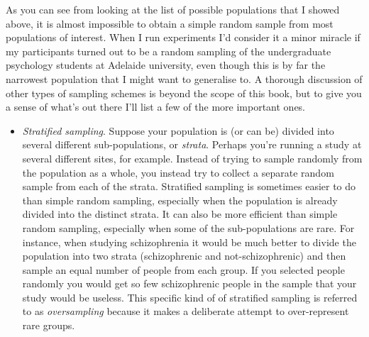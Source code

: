 
As you can see from looking at the list of possible populations that I showed above, it is almost impossible to obtain a simple random sample from most populations of interest. When I run experiments I'd consider it a minor miracle if my participants turned out to be a random sampling of the undergraduate psychology students at Adelaide university, even though this is by far the narrowest population that I might want to generalise to. A thorough discussion of other types of sampling schemes is beyond the scope of this book, but to give you a sense of what's out there I'll list a few of the more important ones.

\begin{itemize} 
\item {\it Stratified sampling}. Suppose your population is (or can be) divided into several different sub-populations, or {\it strata}. Perhaps you're running a study at several different sites, for example. Instead of trying to sample randomly from the population as a whole, you instead try to collect a separate random sample from each of the strata. Stratified sampling is sometimes easier to do than simple random sampling, especially when the population is already divided into the distinct strata. It can also be more efficient than simple random sampling, especially when some of the sub-populations are rare. For instance, when studying schizophrenia it would be much better to divide the population into two  strata (schizophrenic and not-schizophrenic) and then sample an equal number of people from each group. If you selected people randomly you would get so few schizophrenic people in the sample that your study would be useless. This specific kind of of stratified sampling is referred to as {\it oversampling} because it makes a deliberate attempt to over-represent rare groups. 

\end{itemize}
